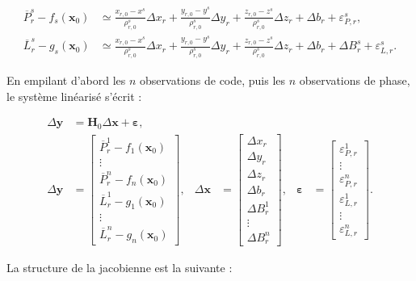 \begin{align}
\overline P_r^s-f_s(\mathbf x_0)
&\simeq
\frac{x_{r,0}-x^s}{\rho_{r,0}^s}\Delta x_r
+\frac{y_{r,0}-y^s}{\rho_{r,0}^s}\Delta y_r
+\frac{z_{r,0}-z^s}{\rho_{r,0}^s}\Delta z_r
+\Delta b_r+\varepsilon_{P,r}^s,
\\
\overline L_r^s-g_s(\mathbf x_0)
&\simeq
\frac{x_{r,0}-x^s}{\rho_{r,0}^s}\Delta x_r
+\frac{y_{r,0}-y^s}{\rho_{r,0}^s}\Delta y_r
+\frac{z_{r,0}-z^s}{\rho_{r,0}^s}\Delta z_r
+\Delta b_r+\Delta B_r^s+\varepsilon_{L,r}^s.
\label{eq:component_linearized_observations}
\end{align}

En empilant d'abord les $n$ observations de code, puis les $n$ observations de
phase, le système linéarisé s'écrit :

\begin{align}
\Delta\mathbf y
&=
\mathbf H_0\Delta\mathbf x+\boldsymbol\varepsilon,
\label{eq:stacked_linearized_system}
\\
\Delta\mathbf y
&=
\begin{bmatrix}
\overline P_r^1-f_1(\mathbf x_0)\\
\vdots\\
\overline P_r^n-f_n(\mathbf x_0)\\
\overline L_r^1-g_1(\mathbf x_0)\\
\vdots\\
\overline L_r^n-g_n(\mathbf x_0)
\end{bmatrix},
&
\Delta\mathbf x
&=
\begin{bmatrix}
\Delta x_r\\
\Delta y_r\\
\Delta z_r\\
\Delta b_r\\
\Delta B_r^1\\
\vdots\\
\Delta B_r^n
\end{bmatrix},
&
\boldsymbol\varepsilon
&=
\begin{bmatrix}
\varepsilon_{P,r}^1\\
\vdots\\
\varepsilon_{P,r}^n\\
\varepsilon_{L,r}^1\\
\vdots\\
\varepsilon_{L,r}^n
\end{bmatrix}.
\label{eq:stacked_vectors}
\end{align}


La structure de la jacobienne est la suivante :

